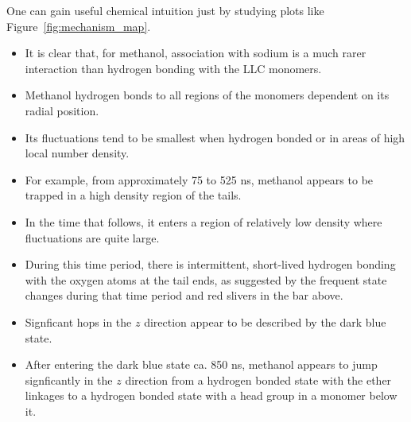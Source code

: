 \documentclass{article}
\begin{document}
  \noindent One can gain useful chemical intuition just by studying plots like
  Figure~\ref{fig:mechanism_map}.
  \begin{itemize}
    \item It is clear that, for methanol, association with sodium is a much rarer
    interaction than hydrogen bonding with the LLC monomers.
    \item Methanol hydrogen bonds to all regions of the monomers dependent on
    its radial position.
    \item Its fluctuations tend to be smallest when hydrogen bonded or in areas
    of high local number density. 
    \item For example, from approximately 75 to 525 ns, methanol appears to be trapped
    in a high density region of the tails.
    \item In the time that follows, it enters a region of relatively low density
    where fluctuations are quite large. 
    \item During this time period, there is intermittent, short-lived hydrogen 
    bonding with the oxygen atoms at the tail ends, as suggested by the frequent 
    state changes during that time period and red slivers in the bar above.
    \item Signficant hops in the $z$ direction appear to be described by the dark blue
    state.
    \item After entering the dark blue state ca. 850 ns, methanol appears to jump
    signficantly in the $z$ direction from a hydrogen bonded state with the ether 
    linkages to a hydrogen bonded state with a head group in a monomer below it.
  \end{itemize}

  
\end{document}
